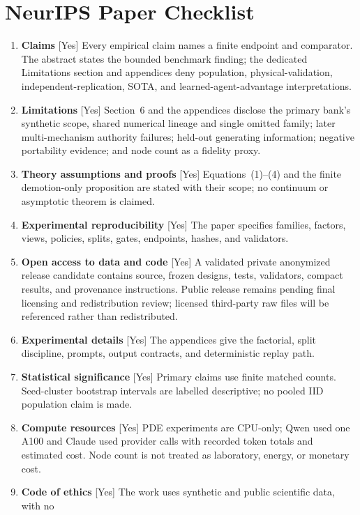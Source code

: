 \clearpage
\section*{NeurIPS Paper Checklist}
\begin{enumerate}[leftmargin=*]
\item \textbf{Claims} [Yes] Every empirical claim names a finite endpoint and comparator. The
abstract states the bounded benchmark finding; the dedicated Limitations section and appendices
deny population, physical-validation, independent-replication, SOTA, and learned-agent-advantage
interpretations.
\item \textbf{Limitations} [Yes] Section~6 and the appendices disclose the primary bank's synthetic
scope, shared numerical lineage and single omitted family; later multi-mechanism authority failures;
held-out generating information; negative portability evidence; and node count as a fidelity proxy.
\item \textbf{Theory assumptions and proofs} [Yes] Equations~(1)--(4) and the finite demotion-only
proposition are stated with their scope; no continuum or asymptotic theorem is claimed.
\item \textbf{Experimental reproducibility} [Yes] The paper specifies families, factors, views,
policies, splits, gates, endpoints, hashes, and validators.
\item \textbf{Open access to data and code} [Yes] A validated private anonymized release candidate
contains source, frozen designs, tests, validators, compact results, and provenance instructions.
Public release remains pending final licensing and redistribution review; licensed third-party raw
files will be referenced rather than redistributed.
\item \textbf{Experimental details} [Yes] The appendices give the factorial, split discipline,
prompts, output contracts, and deterministic replay path.
\item \textbf{Statistical significance} [Yes] Primary claims use finite matched counts.
Seed-cluster bootstrap intervals are labelled descriptive; no pooled IID population claim is made.
\item \textbf{Compute resources} [Yes] PDE experiments are CPU-only; Qwen used one A100 and Claude
used provider calls with recorded token totals and estimated cost. Node count is not treated as
laboratory, energy, or monetary cost.
\item \textbf{Code of ethics} [Yes] The work uses synthetic and public scientific data, with no

\end{enumerate}
